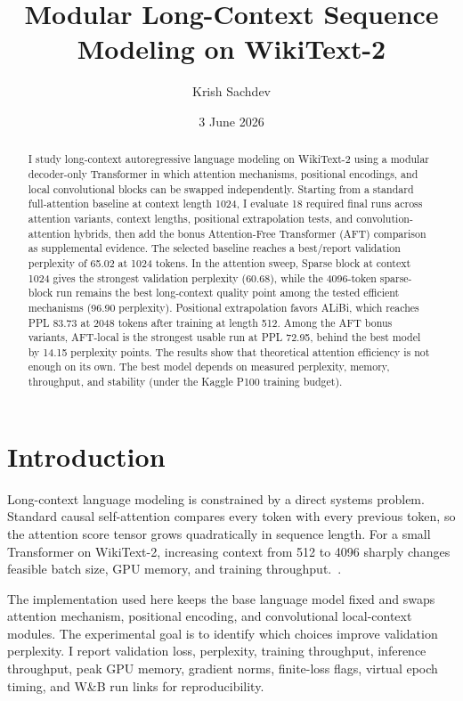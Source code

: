 \documentclass[11pt]{article}
\title{Modular Long-Context Sequence Modeling on WikiText-2}
\author{Krish Sachdev}
\date{3 June 2026}
\begin{document}
\maketitle

\begin{abstract}
I study long-context autoregressive language modeling on WikiText-2 using a modular decoder-only Transformer in which attention mechanisms, positional encodings, and local convolutional blocks can be swapped independently. Starting from a standard full-attention baseline at context length 1024, I evaluate 18 required final runs across attention variants, context lengths, positional extrapolation tests, and convolution-attention hybrids, then add the bonus Attention-Free Transformer (AFT) comparison as supplemental evidence. The selected baseline reaches a best/report validation perplexity of 65.02 at 1024 tokens. In the attention sweep, Sparse block at context 1024 gives the strongest validation perplexity (60.68), while the 4096-token sparse-block run remains the best long-context quality point among the tested efficient mechanisms (96.90 perplexity). Positional extrapolation favors ALiBi, which reaches PPL 83.73 at 2048 tokens after training at length 512. Among the AFT bonus variants, AFT-local is the strongest usable run at PPL 72.95, behind the best model by 14.15 perplexity points. The results show that theoretical attention efficiency is not enough on its own. The best model depends on measured perplexity, memory, throughput, and stability (under the Kaggle P100 training budget).
\end{abstract}

\section{Introduction}
Long-context language modeling is constrained by a direct systems problem. Standard causal self-attention compares every token with every previous token, so the attention score tensor grows quadratically in sequence length. For a small Transformer on WikiText-2, increasing context from 512 to 4096 sharply changes feasible batch size, GPU memory, and training throughput.~\cite{saidl2026}.

The implementation used here keeps the base language model fixed and swaps attention mechanism, positional encoding, and convolutional local-context modules. The experimental goal is to identify which choices improve validation perplexity. I report validation loss, perplexity, training throughput, inference throughput, peak GPU memory, gradient norms, finite-loss flags, virtual epoch timing, and W\&B run links for reproducibility.
\end{document}
